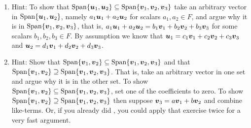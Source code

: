 \begin{enumerate}[!HW!, start=1]
\itemspade Hint: Although we know nothing about the vectors $\bb v_1, \ldots, \bb v_n$, we can still control the scalars $x_i\in F$ such that 
\[x_1\bb v_1 + x_2\bb v_2 + \ldots + x_n\bb v_n = \bb 0.\] What should we set $x_i$ equal to?
%



\item\label{hw:subsetspan} Hint: To show that $\operatorname{Span}\{\boldsymbol u_1, \boldsymbol u_2\} \subseteq \operatorname{Span}\{\boldsymbol v_1, \boldsymbol v_2, \boldsymbol v_3\}$ take an arbitrary vector in $\operatorname{Span}\{\boldsymbol u_1, \boldsymbol u_2\}$, namely $a_1\boldsymbol u_1+a_2\boldsymbol u_2$ for scalars $a_1, a_2\in F$, and argue why it is in $\operatorname{Span}\{\boldsymbol v_1, \boldsymbol v_2, \boldsymbol v_3\}$, that is, $a_1\boldsymbol u_1+a_2\boldsymbol u_2 = b_1\boldsymbol v_1+b_2\boldsymbol v_2+b_3\boldsymbol v_3$ for some scalars $b_1,b_2,b_3\in F$. By assumption we know that $\boldsymbol u_1=c_1\boldsymbol v_1+c_2\boldsymbol v_2+c_3\boldsymbol v_3$ and $\boldsymbol u_2=d_1\boldsymbol v_1+d_2\boldsymbol v_2+d_3\boldsymbol v_3$. 

\item\label{hw:extravectorspan} Hint: Show that $\operatorname{Span}\{\boldsymbol v_1, \boldsymbol v_2\} \subseteq \operatorname{Span}\{\boldsymbol v_1, \boldsymbol v_2, \boldsymbol v_3\}$ and that $\operatorname{Span}\{\boldsymbol v_1, \boldsymbol v_2\} \supseteq \operatorname{Span}\{\boldsymbol v_1, \boldsymbol v_2, \boldsymbol v_3\}$. That is, take an arbitrary vector in one set and argue why it is in the other set. To show $\operatorname{Span}\{\boldsymbol v_1, \boldsymbol v_2\} \subseteq \operatorname{Span}\{\boldsymbol v_1, \boldsymbol v_2, \boldsymbol v_3\}$, set one of the coefficients to zero. To show $\operatorname{Span}\{\boldsymbol v_1, \boldsymbol v_2\} \supseteq \operatorname{Span}\{\boldsymbol v_1, \boldsymbol v_2, \boldsymbol v_3\}$ then suppose $\boldsymbol v_3 = a\boldsymbol v_1 + b \boldsymbol v_2$ and combine like-terms. Or, if you already did , you could apply that exercise twice for a very fast argument.


\end{enumerate}
